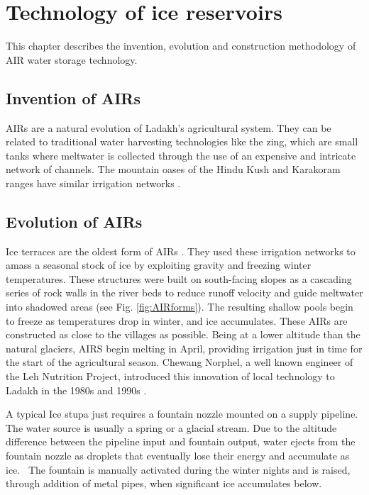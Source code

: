 \chapter{Technology of ice reservoirs}

This chapter describes the invention, evolution and construction methodology of AIR water storage technology.

\section{Invention of AIRs}

AIRs are a natural evolution of Ladakh's agricultural system. They can be related to traditional water
harvesting technologies like the zing, which are small tanks where meltwater is collected through the use of an
expensive and intricate network of channels. The mountain oases of the Hindu Kush and Karakoram ranges have
similar irrigation networks \citep{nusserLocalKnowledgeGlobal2016}.

\section{Evolution of AIRs}

Ice terraces are the oldest form of AIRs \citep{norphelArtificialGlacierHigh2009}. They used these irrigation
networks to amass a seasonal stock of ice by exploiting gravity and freezing winter temperatures. These
structures were built on south-facing slopes as a cascading series of rock walls in the river beds to reduce
runoff velocity and guide meltwater into shadowed areas (see Fig. \ref{fig:AIRforms}). The resulting shallow
pools begin to freeze as temperatures drop in winter, and ice accumulates. These AIRs are constructed as close
to the villages as possible. Being at a lower altitude than the natural glaciers, AIRS begin melting in April,
providing irrigation just in time for the start of the agricultural season. Chewang Norphel, a well known
engineer of the Leh Nutrition Project, introduced this innovation of local technology to Ladakh in the 1980s and
1990s \citep{vinceGlacierMan2009}.

A typical Ice stupa just requires a fountain nozzle mounted on a supply pipeline. The water source is usually a
spring or a glacial stream. Due to the altitude difference between the pipeline input and fountain output, water
ejects from the fountain nozzle as droplets that eventually lose their energy and accumulate as ice.  The
fountain is manually activated during the winter nights and is raised, through addition of metal pipes, when
significant ice accumulates below.

